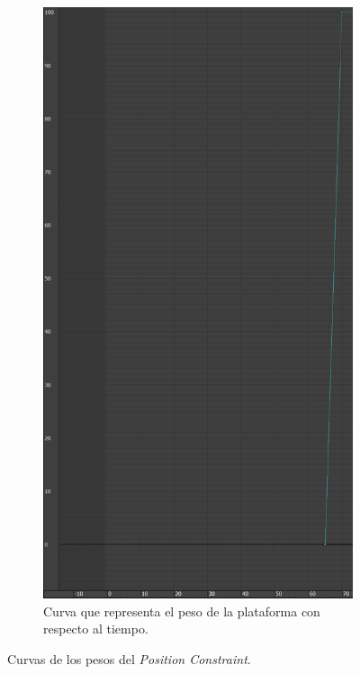 \begin{figure}[H]
\begin{subfigure}[t]{0.27\textwidth}
        \centering
        \includegraphics[width=\textwidth]{imagenes/espada/peso2.png}
        \caption{Curva que representa el peso de la plataforma con respecto al tiempo.}
     \end{subfigure}
     \caption{Curvas de los pesos del \textit{Position Constraint}.}
 \end{figure}

